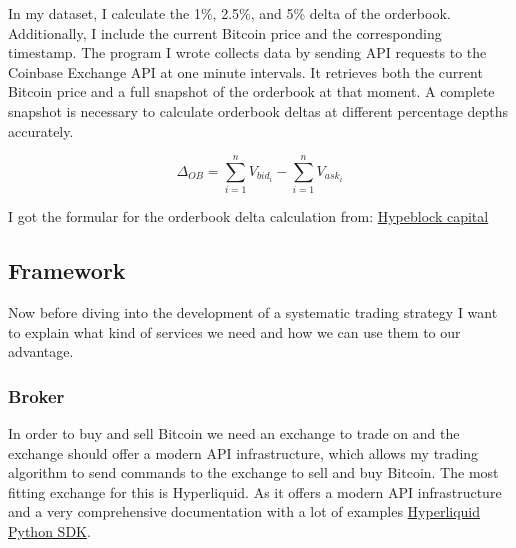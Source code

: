 \documentclass[12pt]{article}
\begin{document}
In my dataset, I calculate the 1\%, 2.5\%, and 5\% delta of the orderbook. Additionally, I include the current Bitcoin price and the corresponding timestamp. The program I wrote collects data by sending API requests to the Coinbase Exchange API at one minute intervals. It retrieves both the current Bitcoin price and a full snapshot of the orderbook at that moment. A complete snapshot is necessary to calculate orderbook deltas at different percentage depths accurately.


\newpage
\begin{equation}
    \Delta_{OB} = \sum_{i=1}^{n} V_{bid_i} - \sum_{i=1}^{n} V_{ask_i}
    \label{eq:orderbook_delta}
\end{equation}

I got the formular for the orderbook delta calculation from: \href{https://academy.hyblockcapital.com/indicators/orderbook/bids-and-asks-delta?utm_source=chatgpt.com}{Hypeblock capital}







\subsection{Framework}
Now before diving into the development of a systematic trading strategy I want to explain what kind of services we need and how we can use them to our advantage.

\subsubsection*{Broker}
In order to buy and sell Bitcoin we need an exchange to trade on and the exchange should offer a modern API infrastructure, which allows my trading algorithm to send commands to the exchange to sell and buy Bitcoin. The most fitting exchange for this is Hyperliquid. As it offers a modern API infrastructure and a very comprehensive documentation with a lot of examples \href{https://github.com/hyperliquid-dex/hyperliquid-python-sdk}{Hyperliquid Python SDK}.   
\end{document}
